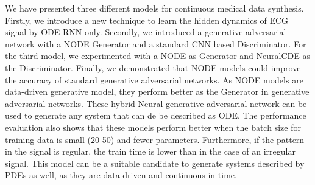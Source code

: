 \documentclass{article}
\begin{document}
We have presented three different models for continuous medical data synthesis. Firstly, we introduce a new technique to learn the hidden dynamics of ECG signal by ODE-RNN only. Secondly, we introduced a generative adversarial network with a NODE Generator and a standard CNN based Discriminator. For the third model, we experimented with a NODE as Generator and NeuralCDE as the Discriminator. Finally,  we demonstrated that NODE models could improve the accuracy of standard generative adversarial networks. As NODE models are data-driven generative model, they perform better as the Generator in generative adversarial networks.  These hybrid Neural generative adversarial network can be used to generate any system that can de be described as ODE. The performance evaluation also shows that these models perform better when the batch size for training data is small (20-50) and fewer parameters. Furthermore, if the pattern in the signal is regular, the train time is lower than in the case of an irregular signal. This model can be a suitable candidate to generate systems described by PDEs as well, as they are data-driven and continuous in time.  





  
\end{document}
